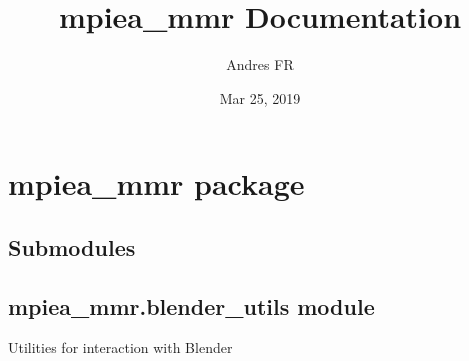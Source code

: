 \documentclass[letterpaper,10pt,english,openany,oneside]{sphinxmanual}
\title{mpiea\_mmr Documentation}
\date{Mar 25, 2019}
\author{Andres FR}
\begin{document}
\pagestyle{empty}
\sphinxmaketitle
\pagestyle{plain}
\sphinxtableofcontents
\pagestyle{normal}
\label{\detokenize{index::doc}}



\chapter{mpiea\_mmr package}
\label{\detokenize{mpiea_mmr:mpiea-mmr-package}}\label{\detokenize{mpiea_mmr::doc}}

\section{Submodules}
\label{\detokenize{mpiea_mmr:submodules}}

\section{mpiea\_mmr.blender\_utils module}
\label{\detokenize{mpiea_mmr:module-mpiea_mmr.blender_utils}}\label{\detokenize{mpiea_mmr:mpiea-mmr-blender-utils-module}}
Utilities for interaction with Blender
\end{document}
